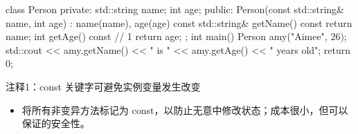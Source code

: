 
\begin{cpp}
class Person {
private:
  std::string name;
  int age;
public:
  Person(const std::string& name, int age) : name(name), age(age) {}
  const std::string& getName() const { return name; }
  int getAge() const { // 1
    return age;
  }
};
int main() {
  Person amy("Aimee", 26);
  std::cout << amy.getName() << " is " << amy.getAge() << " years old\n";
  return 0;
}
\end{cpp}

{\footnotesize
注释1：const 关键字可避免实例变量发生改变
}


\begin{itemize}
\item
将所有非变异方法标记为 const，以防止无意中修改状态；成本很小，但可以保证的安全性。
\end{itemize}












